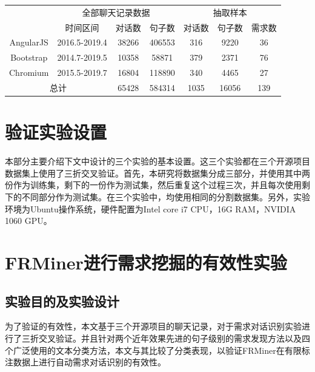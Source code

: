\begin{table}[htbp]
    \label{tab:dataset}
    \centering
    \footnotesize%
    \setlength{\tabcolsep}{4pt}%
    \renewcommand{\arraystretch}{1.2}%
\begin{tabular}{|c|c|c|c|c|c|c|}
\hline
\multirow{}{}{} & \multicolumn{3}{c|}{全部聊天记录数据}    & \multicolumn{3}{c|}{抽取样本} \\ \cline{2-7} 
                  & 时间区间          & 对话数   & 句子数    & 对话数    & 句子数     & 需求数  \\ \hline
AngularJS         & 2016.5-2019.4 & 38266 & 406553 & 316    & 9220    & 36     \\ \hline
Bootstrap         & 2014.7-2019.5 & 10358 & 58871  & 379    & 2371    & 76     \\ \hline
Chromium          & 2015.5-2019.7 & 16804 & 118890 & 340    & 4465    & 27     \\ \hline
\multicolumn{2}{|c|}{总计}          & 65428 & 584314 & 1035   & 16056   & 139    \\ \hline
\end{tabular}
\end{table}

\section{验证实验设置}
本部分主要介绍下文中设计的三个实验的基本设置。这三个实验都在三个开源项目数据集上使用了三折交叉验证\cite{DBLP:conf/ijcai/Kohavi95}。首先，本研究将数据集分成三部分，并使用其中两份作为训练集，剩下的一份作为测试集，然后重复这个过程三次，并且每次使用剩下的不同部分作为测试集。在三个实验中，均使用相同的分割数据集。另外，实验环境为Ubuntu操作系统，硬件配置为Intel core i7 CPU，16G RAM，NVIDIA 1060 GPU。


\section{FRMiner进行需求挖掘的有效性实验}
\subsection{实验目的及实验设计}
为了验证{\tool}的有效性，本文基于三个开源项目的聊天记录，对于需求对话识别实验进行了三折交叉验证。并且针对两个近年效果先进的句子级别的需求发现方法以及四个广泛使用的文本分类方法，本文与其比较了分类表现，以验证FRMiner在有限标注数据上进行自动需求对话识别的有效性。

